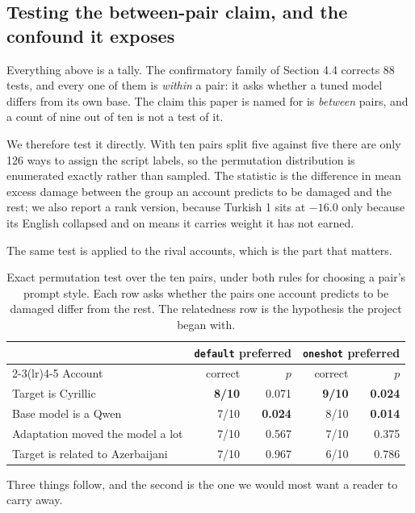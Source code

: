 \documentclass[final]{clv2025}
\begin{document}
\subsection{Testing the between-pair claim, and the confound it exposes}
\label{sec:between}

Everything above is a tally. The confirmatory family of Section 4.4 corrects 88
tests, and every one of them is \emph{within} a pair: it asks whether a tuned
model differs from its own base. The claim this paper is named for is
\emph{between} pairs, and a count of nine out of ten is not a test of it.

We therefore test it directly. With ten pairs split five against five there are
only 126 ways to assign the script labels, so the permutation distribution is
enumerated exactly rather than sampled. The statistic is the difference in mean
excess damage between the group an account predicts to be damaged and the rest;
we also report a rank version, because Turkish 1 sits at $-16.0$ only because
its English collapsed and on means it carries weight it has not earned.

The same test is applied to the rival accounts, which is the part that matters.

\begin{table}[h!]
\caption{Exact permutation test over the ten pairs, under both rules for
choosing a pair's prompt style. Each row asks whether the pairs one account
predicts to be damaged differ from the rest. The relatedness row is the
hypothesis the project began with.}
\label{tab:between}
\centering
\small
\begin{tabular}{lrrrr}
\toprule
& \multicolumn{2}{c}{\texttt{default} preferred} & \multicolumn{2}{c}{\texttt{oneshot} preferred} \\
\cmidrule(lr){2-3}\cmidrule(lr){4-5}
Account & correct & $p$ & correct & $p$ \\
\midrule
Target is Cyrillic & \textbf{8/10} & 0.071 & \textbf{9/10} & \textbf{0.024} \\
Base model is a Qwen & 7/10 & \textbf{0.024} & 8/10 & \textbf{0.014} \\
Adaptation moved the model a lot & 7/10 & 0.567 & 7/10 & 0.375 \\
Target is related to Azerbaijani & 7/10 & 0.967 & 6/10 & 0.786 \\
\bottomrule
\end{tabular}
\end{table}

Three things follow, and the second is the one we would most want a reader to
carry away.
\end{document}
